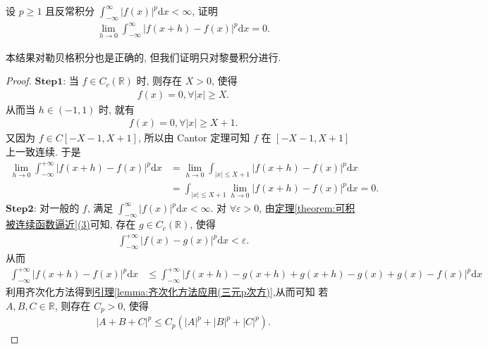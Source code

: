 \documentclass[../../main.tex]{subfiles}%
\begin{document}
\begin{theorem}[积分的绝对连续性]\label{theorem:积分的绝对连续性11111111}
设 $p \geqslant 1$ 且反常积分 $\int_{-\infty}^{\infty} |f(x)|^{p}\mathrm{d}x < \infty$, 证明
\begin{align}
\lim_{h \to 0} \int_{-\infty}^{\infty} |f(x + h) - f(x)|^{p}\mathrm{d}x = 0. \label{theorem-equation-积分的绝对连续性-13.118}
\end{align}
\end{theorem}
\begin{note}
本结果对勒贝格积分也是正确的, 但我们证明只对黎曼积分进行.
\end{note}
\begin{proof}

$\mathbf{Step}\mathbf{1}$: 当 $f\in C_c(\mathbb{R})$ 时, 则存在 $X>0$, 使得
\begin{align*}
f(x) = 0, \forall |x| \geqslant X.
\end{align*}
从而当 $h\in (-1,1)$ 时, 就有
\begin{align*}
f(x) = 0, \forall |x| \geqslant X + 1.
\end{align*}
又因为 $f\in C[-X - 1,X + 1]$, 所以由 Cantor 定理可知 $f$ 在 $[-X - 1,X + 1]$ 上一致连续. 于是
\begin{align*}
\lim_{h\rightarrow 0} \int_{-\infty}^{+\infty} |f(x + h) - f(x)|^p \mathrm{d}x &= \lim_{h\rightarrow 0} \int_{|x| \leqslant X + 1} |f(x + h) - f(x)|^p \mathrm{d}x \\
&= \int_{|x| \leqslant X + 1} \lim_{h\rightarrow 0} |f(x + h) - f(x)|^p \mathrm{d}x = 0.
\end{align*}
$\mathbf{Step}\mathbf{2}$: 对一般的 $f$, 满足 $\int_{-\infty}^{\infty} |f(x)|^p \mathrm{d}x < \infty$. 对 $\forall \varepsilon > 0$, 由\hyperref[theorem:可积被连续函数逼近]{定理\ref{theorem:可积被连续函数逼近}(3)}可知, 存在 $g\in C_c(\mathbb{R})$, 使得
\begin{align*}
\int_{-\infty}^{+\infty} |f(x) - g(x)|^p \mathrm{d}x < \varepsilon.
\end{align*}
从而
\begin{align*}
\int_{-\infty}^{+\infty} |f(x + h) - f(x)|^p \mathrm{d}x &\leqslant \int_{-\infty}^{+\infty} |f(x + h) - g(x + h) + g(x + h) - g(x) + g(x) - f(x)|^p \mathrm{d}x
\end{align*}
利用齐次化方法得到\hyperref[lemma:齐次化方法应用(三元p次方)]{引理\ref{lemma:齐次化方法应用(三元p次方)}},从而可知 若 $A,B,C\in \mathbb{R}$, 则存在 $C_p>0$, 使得
\begin{align*}
|A + B + C|^p \leqslant C_p(|A|^p + |B|^p + |C|^p).

\end{align*}
\end{proof}
\end{document}
